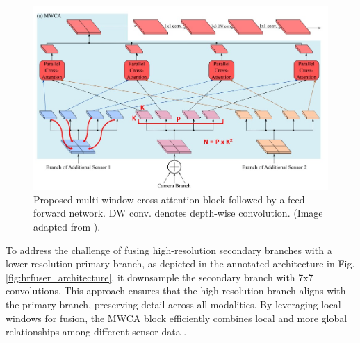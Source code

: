 \documentclass[report.tex]{subfiles}
\begin{document}
    \begin{figure}[h]
        \centering
        \includegraphics[width=1.0\textwidth]{images/methods/hrfuser/mwca_block_annotated_2.png}
        \caption{Proposed multi-window cross-attention block followed by a feed-forward network. DW conv. denotes depth-wise convolution. (Image adapted from \cite{broedermann2022hrfuser}).}
        \label{fig:hrfuser_mwca_block}
    \end{figure}

    To address the challenge of fusing high-resolution secondary branches with a lower resolution primary branch, as depicted in the annotated architecture in Fig. \ref{fig:hrfuser_architecture}, it downsample the secondary branch with 7x7 convolutions. This approach ensures that the high-resolution branch aligns with the primary branch, preserving detail across all modalities. By leveraging local windows for fusion, the MWCA block efficiently combines local and more global relationships among different sensor data \cite{broedermann2022hrfuser}.

\end{document}
